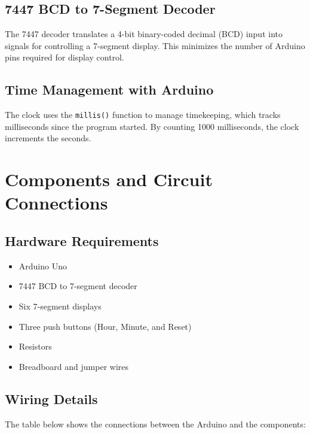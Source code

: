 \documentclass[a4paper,12pt]{article}
\begin{document}
\subsection{7447 BCD to 7-Segment Decoder}
The 7447 decoder translates a 4-bit binary-coded decimal (BCD) input into signals for controlling a 7-segment display. This minimizes the number of Arduino pins required for display control.

\subsection{Time Management with Arduino}
The clock uses the \texttt{millis()} function to manage timekeeping, which tracks milliseconds since the program started. By counting 1000 milliseconds, the clock increments the seconds.

\section{Components and Circuit Connections}
\subsection{Hardware Requirements}
\begin{itemize}
    \item Arduino Uno
    \item 7447 BCD to 7-segment decoder
    \item Six 7-segment displays
    \item Three push buttons (Hour, Minute, and Reset)
    \item Resistors
    \item Breadboard and jumper wires
\end{itemize}

\subsection{Wiring Details}
The table below shows the connections between the Arduino and the components:
\end{document}
